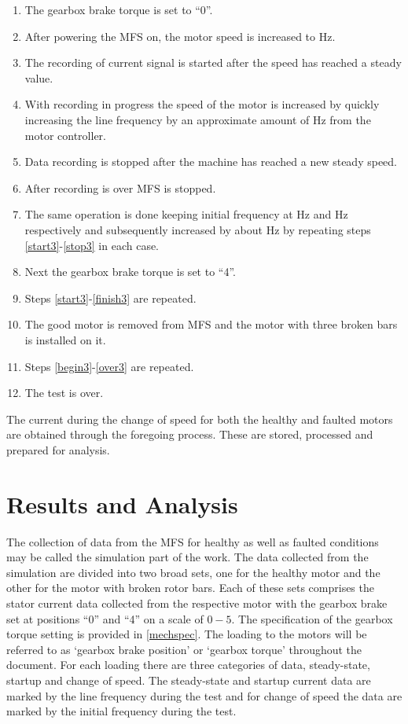 \documentclass[a4paper,11pt]{report}
\begin{document}
\begin{enumerate}
\item The gearbox brake torque is set to ``0''. \label{begin3}
\item After powering the MFS on, the motor speed is increased to \unit[30]{Hz}. \label{start3}
\item The recording of current signal is started after the speed has reached a steady value.
\item With recording in progress the speed of the motor is increased by quickly increasing the line frequency by an approximate amount of \unit[10]{Hz} from the motor controller.
\item Data recording is stopped after the machine has reached a new steady speed.
\item After recording is over MFS is stopped. \label{stop3}
\item The same operation is done keeping initial frequency at \unit[40]{Hz} and \unit[50]{Hz} respectively and subsequently increased by about \unit[10]{Hz} by repeating steps \ref{start3}-\ref{stop3} in each case. \label{finish3}
\item Next the gearbox brake torque is set to ``4''.
\item Steps \ref{start3}-\ref{finish3} are repeated. \label{over3}
\item The good motor is removed from MFS and the motor with three broken bars is installed on it.
\item Steps \ref{begin3}-\ref{over3} are repeated.
\item The test is over.
\end{enumerate}

The current during the change of speed for both the healthy and faulted motors are obtained through the foregoing process. These are stored, processed and prepared for analysis.

\chapter{Results and Analysis}
The collection of data from the MFS for healthy as well as faulted conditions may be called the simulation part of the work. The data collected from the simulation are divided into two broad sets, one for the healthy motor and the other for the motor with broken rotor bars. Each of these sets comprises the stator current data collected from the respective motor with the gearbox brake set at positions ``0'' and ``4'' on a scale of $0-5$. The specification of the gearbox torque setting is provided in \ref{mechspec}. The loading to the motors will be referred to as `gearbox brake position' or `gearbox torque' throughout the document. For each loading there are three categories of data, steady-state, startup and change of speed. The steady-state and startup current data are marked by the line frequency during the test and for change of speed the data are marked by the initial frequency during the test.
\end{document}
